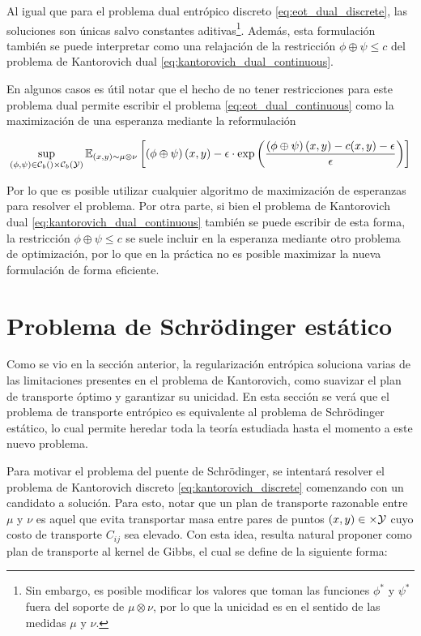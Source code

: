 Al igual que para el problema dual entrópico discreto \eqref{eq:eot_dual_discrete}, las soluciones son únicas salvo constantes aditivas\footnote{Sin embargo, es posible modificar los valores que toman las funciones $\phi^*$ y $\psi^*$ fuera del soporte de $\mu\otimes\nu$, por lo que la unicidad es en el sentido de las medidas $\mu$ y $\nu$.}. Además, esta formulación también se puede interpretar como una relajación de la restricción $\phi\oplus\psi\leq c$ del problema de Kantorovich dual \eqref{eq:kantorovich_dual_continuous}.

En algunos casos es útil notar que el hecho de no tener restricciones para este problema dual permite escribir el problema \eqref{eq:eot_dual_continuous} como la maximización de una esperanza mediante la reformulación

\begin{equation*}
	\sup_{(\phi,\psi)\in \mathcal{C}_b\left(\right)\times \mathcal{C}_b\left(\mathcal{Y}\right)}
	\mathbb{E}_{(x,y)\sim \mu\otimes\nu}\left[\left(\phi\oplus\psi\right)(x,y) - \epsilon\cdot \exp\left(\frac{\left(\phi\oplus\psi\right)(x,y) - c(x,y) - \epsilon}{\epsilon}\right)\right]
\end{equation*}

Por lo que es posible utilizar cualquier algoritmo de maximización de esperanzas para resolver el problema. Por otra parte, si bien el problema de Kantorovich dual \eqref{eq:kantorovich_dual_continuous} también se puede escribir de esta forma, la restricción $\phi\oplus\psi\leq c$ se suele incluir en la esperanza mediante otro problema de optimización, por lo que en la práctica no es posible maximizar la nueva formulación de forma eficiente.

\section{Problema de Schrödinger estático}
\label{eot_sbp/static_sbp}

Como se vio en la sección anterior, la regularización entrópica soluciona varias de las limitaciones presentes en el problema de Kantorovich, como suavizar el plan de transporte óptimo y garantizar su unicidad. En esta sección se verá que el problema de transporte entrópico es equivalente al problema de Schrödinger estático, lo cual permite heredar toda la teoría estudiada hasta el momento a este nuevo problema.

Para motivar el problema del puente de Schrödinger, se intentará resolver el problema de Kantorovich discreto \eqref{eq:kantorovich_discrete} comenzando con un candidato a solución. Para esto, notar que un plan de transporte razonable entre $\mu$ y $\nu$ es aquel que evita transportar masa entre pares de puntos $(x,y)\in\times\mathcal{Y}$ cuyo costo de transporte $C_{ij}$ sea elevado. Con esta idea, resulta natural proponer como plan de transporte al kernel de Gibbs, el cual se define de la siguiente forma:

